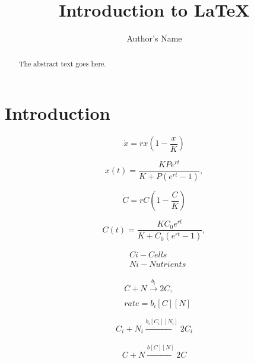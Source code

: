 \documentclass{article}
\begin{document}
\title{Introduction to \LaTeX{}}
\author{Author's Name}

\maketitle

\begin{abstract}
The abstract text goes here.
\end{abstract}

\section{Introduction}


\begin{equation}
\label{eq:1}
\dot{x} = rx\left(1 - \frac{x}{K}\right)
\end{equation}

\begin{equation}
\label{eq:2}
x(t) = \frac{KPe^{rt}}{K + P(e^{rt}-1)},
\end{equation}

\begin{equation}
\dot{C} = rC\left(1 - \frac{C}{K}\right)
\end{equation}

\begin{equation}
C(t) = \frac{KC_{0}e^{rt}}{K + C_{0}(e^{rt}-1)},
\end{equation}

\begin{subequations}
	\begin{align}
	&C{i} - Cells\\
	&N{i} - Nutrients
	\end{align}
\end{subequations}

\begin{subequations}
	\label{eq:9}
	\begin{align}
	&C + N \xrightarrow[]{b_{i}} 2C,\\
	&rate = b_{i}[C][N]
	\end{align}
\end{subequations}

\begin{equation}
	C_{i} + N_{i} \xrightarrow[]{b_{i}[C_{i}][N_{i}]} 2C_{i}
\end{equation}

\begin{equation}
C + N \xrightarrow[]{b[C][N]} 2C
\end{equation}
\end{document}
